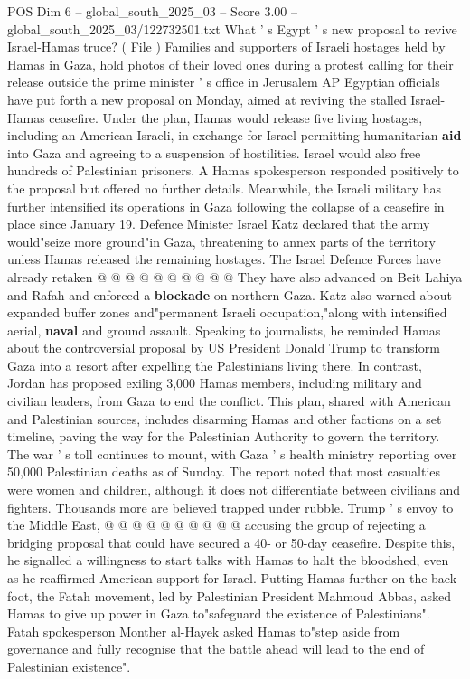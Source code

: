 \begin{textsample}{POS Dim 6 – global\_south\_2025\_03 – Score 3.00 – global\_south\_2025\_03/122732501.txt}  \label{ex:f6_pos_229}
What ' s Egypt ' s new proposal to revive Israel-Hamas truce? ( File ) Families and supporters of Israeli hostages held by Hamas in Gaza, hold photos of their loved ones during a protest calling for their release outside the prime minister ' s office in Jerusalem AP Egyptian officials have put forth a new proposal on Monday, aimed at reviving the stalled Israel-Hamas ceasefire.
Under the plan, Hamas would release five living hostages, including an American-Israeli, in exchange for Israel permitting humanitarian \textbf{aid} into Gaza and agreeing to a suspension of hostilities.
Israel would also free hundreds of Palestinian prisoners.
A Hamas spokesperson responded positively to the proposal but offered no further details.
Meanwhile, the Israeli military has further intensified its operations in Gaza following the collapse of a ceasefire in place since January 19.
Defence Minister Israel Katz declared that the army would"seize more ground"in Gaza, threatening to annex parts of the territory unless Hamas released the remaining hostages.
The Israel Defence Forces have already retaken @ @ @ @ @ @ @ @ @ @ They have also advanced on Beit Lahiya and Rafah and enforced a \textbf{blockade} on northern Gaza.
Katz also warned about expanded buffer zones and"permanent Israeli occupation,"along with intensified aerial, \textbf{naval} and ground assault.
Speaking to journalists, he reminded Hamas about the controversial proposal by US President Donald Trump to transform Gaza into a resort after expelling the Palestinians living there.
In contrast, Jordan has proposed exiling 3,000 Hamas members, including military and civilian leaders, from Gaza to end the conflict.
This plan, shared with American and Palestinian sources, includes disarming Hamas and other factions on a set timeline, paving the way for the Palestinian Authority to govern the territory.
The war ' s toll continues to mount, with Gaza ' s health ministry reporting over 50,000 Palestinian deaths as of Sunday.
The report noted that most casualties were women and children, although it does not differentiate between civilians and fighters.
Thousands more are believed trapped under rubble.
Trump ' s envoy to the Middle East, @ @ @ @ @ @ @ @ @ @ accusing the group of rejecting a bridging proposal that could have secured a 40- or 50-day ceasefire.
Despite this, he signalled a willingness to start talks with Hamas to halt the bloodshed, even as he reaffirmed American support for Israel.
Putting Hamas further on the back foot, the Fatah movement, led by Palestinian President Mahmoud Abbas, asked Hamas to give up power in Gaza to"safeguard the existence of Palestinians".
Fatah spokesperson Monther al-Hayek asked Hamas to"step aside from governance and fully recognise that the battle ahead will lead to the end of Palestinian existence".

\end{textsample}
